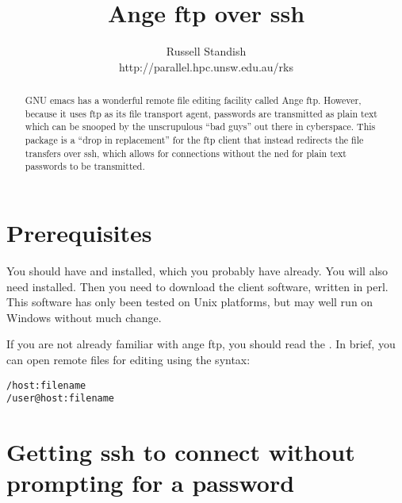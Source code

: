 \title{Ange ftp over ssh}
\author{Russell Standish\\http://parallel.hpc.unsw.edu.au/rks}

\maketitle

\begin{abstract}
GNU emacs has a wonderful remote file editing facility called Ange
ftp. However, because it uses ftp as its file transport agent,
passwords are transmitted as plain text which can be snooped by the
unscrupulous ``bad guys'' out there in cyberspace. This package is a
``drop in replacement'' for the ftp client that instead redirects the
file transfers over ssh, which allows for connections without the ned
for plain text passwords to be transmitted.
\end{abstract}

\section{Prerequisites}

You should have  and
 installed, which you
probably have already. You will also need  installed. Then you need to download the
client software, written in perl. This software has only been tested
on Unix platforms, but may well run on Windows without much change.

If you are not already familiar with ange ftp, you should read the
.
In brief, you can open remote files for editing using the syntax:
\begin{verbatim}
/host:filename
/user@host:filename
\end{verbatim}

\section{Getting ssh to connect without prompting for a password}

